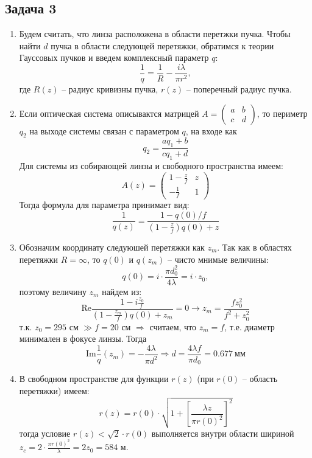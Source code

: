 \documentclass[a4paper, 12pt]{article}
\begin{document}
\subsection*{Задача 3}
\begin{enumerate}
\item Будем считать, что линза расположена в области перетжки пучка. Чтобы найти $d$ пучка в области следующей перетяжки, обратимся к теории Гауссовых пучков и введем комплексный параметр $q$:
\begin{equation*}
	\frac{1}{q}=\frac{1}{R}-\frac{i\lambda}{\pi r^2},
\end{equation*}
где $R(z)$ -- радиус кривизны пучка, $r(z)$ -- поперечный радиус пучка.
\item Если оптическая система описывактся матрицей $A=\left(\begin{matrix}
a & b\\
c & d
\end{matrix}\right)$, то периметр $q_2$ на выходе системы связан с параметром $q$, на входе как
\begin{equation*}
	q_2=\frac{aq_1+b}{cq_1+d}
\end{equation*}
Для системы из собирающей линзы и свободного пространства имеем:
\begin{equation*}
	A(z)=\left(\begin{matrix}
	1-\frac{z}{f} & z\\
	-\frac{1}{f} & 1
	\end{matrix}
	\right)
\end{equation*}
Тогда формула для параметра принимает вид:
\begin{equation*}
	\frac{1}{q(z)}=\frac{1-q(0)/f}{\left(1-\frac{z}{f}\right)q(0)+z}
\end{equation*}
\item Обозначим координату следуюшей перетяжки как $z_m$. Так как в областях перетяжки $R=\infty$, то $q(0)$ и $q(z_m)$ -- чисто мнимые величины:
\begin{equation*}
	q(0)=i\cdot\frac{\pi d_0^2}{4\lambda}=i\cdot z_0,
\end{equation*}
поэтому величину $z_m$ найдем из:
\begin{equation*}
	\text{Re}\frac{1-i\frac{z_0}{f}}{\left(1-\frac{z_m}{f}\right)q(0)+z_m}=0\longrightarrow z_m=\frac{fz_0^2}{f^2+z_0^2}	
\end{equation*}
т.к. $z_0=295$ см $\gg f=20$ см $\Rightarrow$ считаем, что $z_m=f$, т.е. диаметр минимален в фокусе линзы. Тогда
\begin{equation*}
	\text{Im}\frac{1}{q}(z_m)=-\frac{4\lambda}{\pi d^2}\Rightarrow d=\frac{4\lambda f}{\pi d_0}=0.677\ \text{мм}
\end{equation*}
\item В свободном пространстве для функции $r(z)$ (при $r(0)$ -- область перетяжки) имеем:
\begin{equation*}
	r(z)=r(0)\cdot\sqrt{1+\left[\frac{\lambda z}{\pi r(0)^2}\right]^2}
\end{equation*}
тогда условие $r(z)<\sqrt{2}\cdot r(0)$ выполняется внутри области шириной $z_c=2\cdot\frac{\pi r(0)^2}{\lambda}=2z_0=584$ м.
\end{enumerate}
\end{document}
